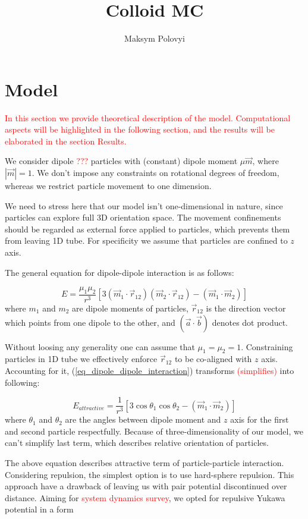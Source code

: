 \documentclass[12pt,a4paper]{article}
\author{Maksym Polovyi}
\title{Colloid MC}
\begin{document}
\section{Model}

\textcolor{red}{In this section we provide theoretical description of the model. Computational aspects will be highlighted in the following section, and the results will be elaborated in the section Results.}

We consider dipole \textcolor{red}{???} particles with (constant) dipole moment $\mu \vec{m}$, where $|\vec{m}| = 1$. We don't impose any constraints on rotational degrees of freedom, whereas we restrict particle movement to one dimension.

We need to stress here that our model isn't one-dimensional in nature, since particles can explore full 3D orientation space. The movement confinements should be regarded as external force applied to particles, which prevents them from leaving 1D tube. For specificity we assume that particles are confined to $z$ axis.

The general equation for dipole-dipole interaction is as follows:

\label{eq_dipole_dipole_interaction}
\begin{equation}
E = \frac{\mu_1 \mu_2}{r^3}[3 (\vec{m}_1 \cdot \vec{r}_{12})(\vec{m}_2 \cdot \vec{r}_{12}) - (\vec{m}_1 \cdot \vec{m}_2)]
\end{equation}
where $m_1$ and $m_2$ are dipole moments of particles, $\vec{r}_{12}$ is the direction vector which points from one dipole to the other, and $(\vec{a} \cdot \vec{b})$ denotes dot product.

Without loosing any generality one can assume that $\mu_1 = \mu_2 = 1$. Constraining particles in 1D tube we effectively enforce $\vec{r}_{12}$ to be co-aligned with $z$ axis. Accounting for it, (\ref{eq_dipole_dipole_interaction}) transforms \textcolor{red}{(simplifies)} into following:

\label{eq_dipole_dipole_1D}
\begin{equation}
E_{attractive} = \frac{1}{r^3} [3 \cos \theta_1 \cos \theta_2 - (\vec{m}_1 \cdot \vec{m}_2)]
\end{equation}
where $\theta_1$ and $\theta_2$ are the angles between dipole moment and $z$ axis for the first and second particle respectfully. Because of three-dimensionality of our model, we can't simplify last term, which describes relative orientation of particles.

The above equation describes attractive term of particle-particle interaction. Considering repulsion, the simplest option is to use hard-sphere repulsion. This approach have a drawback of leaving us with pair potential discontinued over distance. Aiming for \textcolor{red}{system dynamics survey}, we opted for repulsive Yukawa potential in a form
\end{document}
